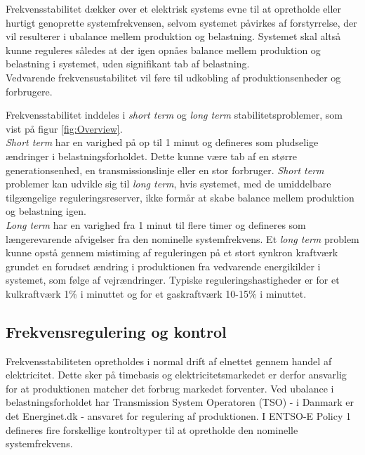 
\label{Frekvensstabilitet}

Frekvensstabilitet dækker over et elektrisk systems evne til at opretholde eller hurtigt genoprette systemfrekvensen, selvom systemet påvirkes af forstyrrelse, der vil resulterer i ubalance mellem produktion og belastning. Systemet skal altså kunne reguleres således at der igen opnåes balance mellem produktion og belastning i systemet, uden signifikant tab af belastning.\\
Vedvarende frekvensustabilitet vil føre til udkobling af produktionsenheder og forbrugere.

Frekvensstabilitet inddeles i \textit{short term} og \textit{long term} stabilitetsproblemer, som vist på figur \ref{fig:Overview}.\\
\textit{Short term} har en varighed på op til 1 minut og defineres som pludselige ændringer i belastningsforholdet. Dette kunne være tab af en større generationsenhed, en transmissionslinje eller en stor forbruger. \textit{Short term} problemer kan udvikle sig til \textit{long term}, hvis systemet, med de umiddelbare tilgængelige reguleringsreserver, ikke formår at skabe balance mellem produktion og belastning igen.\\
\textit{Long term} har en varighed fra 1 minut til flere timer og defineres som længerevarende afvigelser fra den nominelle systemfrekvens. Et \textit{long term} problem kunne opstå gennem mistiming af reguleringen på et stort synkron kraftværk grundet en forudset ændring i produktionen fra vedvarende energikilder i systemet, som følge af vejrændringer.
Typiske reguleringshastigheder er for et kulkraftværk 1\% i minuttet og for et gaskraftværk 10-15\% i minuttet.

\subsection{Frekvensregulering og kontrol}
Frekvensstabiliteten opretholdes i normal drift af elnettet gennem handel af elektricitet. Dette sker på timebasis og elektricitetsmarkedet er derfor ansvarlig for at produktionen matcher det forbrug markedet forventer. Ved ubalance i belastningsforholdet har Transmission System Operatoren (TSO) - i Danmark er det Energinet.dk - ansvaret for regulering af produktionen. I ENTSO-E Policy 1 defineres fire forskellige kontroltyper til at opretholde den nominelle systemfrekvens.

